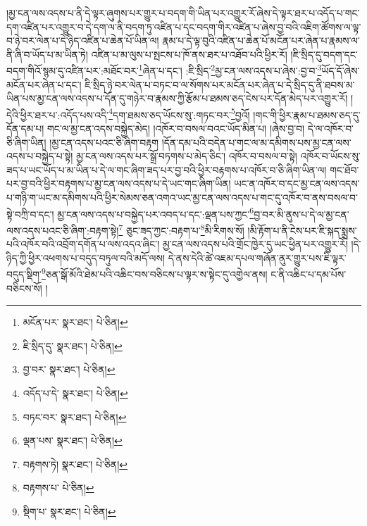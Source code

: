 །མྱ་ངན་ལས་འདས་པ་ནི་དེ་ལྟར་ཞུགས་པར་གྱུར་པ་བདག་གི་ཡིན་པར་འགྱུར་རོ་ཞེས་དེ་ལྟར་ཐར་པ་འདོད་པ་གང་དག་འཛིན་པར་འགྱུར་བ་དེ་དག་ལ་ནི་བདག་ཏུ་འཛིན་པ་དང་བདག་གིར་འཛིན་པ་ཞེས་བྱ་བའི་འཇིག་ཚོགས་ལ་ལྟ་བ་ཉེ་བར་ལེན་པ་དེ་ཉིད་འཛིན་པ་ཆེན་པོ་ཡིན་ལ། རྣམ་པ་དེ་ལྟ་བུའི་འཛིན་པ་ཆེན་པོ་མངོན་པར་ཞེན་པ་རྣམས་ལ་ནི་ཞི་བ་ཡོད་པ་མ་ཡིན་ཏེ། འཛིན་པ་མ་ལུས་པ་སྤངས་པ་ཁོ་ནས་ཐར་པ་འཐོབ་པའི་ཕྱིར་རོ། །ཇི་སྲིད་དུ་བདག་དང་བདག་གིའོ་སྙམ་དུ་འཛིན་པར་:མཐོང་བར་\footnote{མངོན་པར་  སྣར་ཐང་།  པེ་ཅིན། }ཞེན་པ་དང་། :ཇི་སྲིད་\footnote{ཇི་སྲིད་དུ་  སྣར་ཐང་།  པེ་ཅིན། }མྱ་ངན་ལས་འདས་པ་ཞེས་:བྱ་བ་\footnote{བྱ་བར་  སྣར་ཐང་།  པེ་ཅིན། }ཡོད་དོ་ཞེས་མངོན་པར་ཞེན་པ་དང་། ཇི་སྲིད་ཉེ་བར་ལེན་པ་བཏང་བ་ལ་སོགས་པར་མངོན་པར་ཞེན་པ་དེ་སྲིད་དུ་ནི་ཐབས་མ་ཡིན་པས་མྱ་ངན་ལས་འདས་པ་དོན་དུ་གཉེར་བ་རྣམས་ཀྱི་རྩོམ་པ་ཐམས་ཅད་ངེས་པར་དོན་མེད་པར་འགྱུར་རོ། །དེའི་ཕྱིར་ཐར་པ་:འདོད་པས་འདི་\footnote{འདོད་པ་དེ་  སྣར་ཐང་།  པེ་ཅིན། }དག་ཐམས་ཅད་ཡོངས་སུ་:གཏང་བར་\footnote{བཏང་བར་  སྣར་ཐང་།  པེ་ཅིན། }བྱའོ། །གང་གི་ཕྱིར་རྣམ་པ་ཐམས་ཅད་དུ་དོན་དམ་པ། གང་ལ་མྱ་ངན་འདས་བསྐྱེད་མེད། །འཁོར་བ་བསལ་བའང་ཡོད་མིན་པ། །ཞེས་བྱ་བ། དེ་ལ་འཁོར་བ་ཅི་ཞིག་ཡིན། །མྱ་ངན་འདས་པའང་ཅི་ཞིག་བརྟག །དོན་དམ་པའི་བདེན་པ་གང་ལ་མ་དམིགས་པས་མྱ་ངན་ལས་འདས་པ་བསྐྱེད་པ་སྟེ། མྱ་ངན་ལས་འདས་པར་སྒྲོ་བཏགས་པ་མེད་ཅིང་། འཁོར་བ་བསལ་བ་སྟེ། འཁོར་བ་ཡོངས་སུ་ཟད་པ་ཡང་ཡོད་པ་མ་ཡིན་པ་དེ་ལ་གང་ཞིག་ཟད་པར་བྱ་བའི་ཕྱིར་བརྟགས་པ་འཁོར་བ་ཅི་ཞིག་ཡིན་ལ། གང་ཐོབ་པར་བྱ་བའི་ཕྱིར་བརྟགས་པ་མྱ་ངན་ལས་འདས་པ་དེ་ཡང་གང་ཞིག་ཡིན། ཡང་ན་འཁོར་བ་དང་མྱ་ངན་ལས་འདས་པ་གཉི་ག་ཡང་མ་དམིགས་པའི་ཕྱིར་སེམས་ཅན་འགའ་ཡང་མྱ་ངན་ལས་འདས་པ་གང་དུ་འཁོར་བ་ནས་བསལ་བ་སྟེ་བཀྲི་བ་དང་། མྱ་ངན་ལས་འདས་པ་བསྐྱེད་པར་འབད་པ་དང་:ལྡན་པས་ཀྱང་\footnote{ལྡན་པས་  སྣར་ཐང་།  པེ་ཅིན། }བྱ་བར་མི་ནུས་པ་དེ་ལ་མྱ་ངན་ལས་འདས་པའང་ཅི་ཞིག་:བརྟག་སྟེ།\footnote{བརྟགས་ཏེ།  སྣར་ཐང་།  པེ་ཅིན། } ཅུང་ཟད་ཀྱང་:བརྟག་པ་\footnote{བརྟགས་པ་  པེ་ཅིན། }མི་རིགས་སོ། །མི་རྟོག་པ་ནི་ངེས་པར་ཇི་སྐད་སྨྲས་པའི་འཁོར་བའི་འབྲོག་དགོན་པ་ལས་འདའ་ཞིང་། མྱ་ངན་ལས་འདས་པའི་གྲོང་ཁྱེར་དུ་ཡང་ཕྱིན་པར་འགྱུར་རོ། །དེ་ཉིད་ཀྱི་ཕྱིར་འཕགས་པ་བདུད་བཏུལ་བའི་མདོ་ལས། དེ་ནས་དེའི་ཚེ་འཇམ་དཔལ་གཞོན་ནུར་གྱུར་པས་ཇི་ལྟར་བདུད་སྡིག་\footnote{སྡིག་པ་  སྣར་ཐང་།  པེ་ཅིན། }ཅན་སྒོ་མོའི་ཐེམ་པའི་འཆིང་བས་བཅིངས་པ་ལྟར་ས་སྟེང་དུ་འགྱེལ་ནས། ང་ནི་འཆིང་པ་དམ་པོས་བཅིངས་སོ། །
